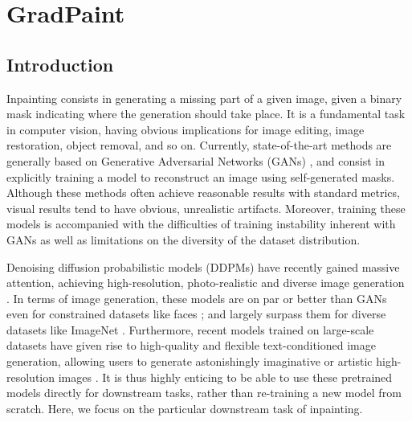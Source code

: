 \chapter{GradPaint}
\label{chapter:gradpaint}

 


\section{Introduction}

Inpainting consists in generating a missing part of a given image, given a binary mask 
indicating where the generation should take place. It is a fundamental task in computer
 vision, having obvious implications for image editing, image restoration, object 
 removal, and so on. Currently, state-of-the-art methods are generally based on 
 Generative Adversarial Networks (GANs) \cite{lama, zhao2021comodgan}, and consist 
 in explicitly training a model to reconstruct an image using self-generated masks.
  Although these methods often achieve reasonable results with standard metrics, 
  visual results tend to have obvious, unrealistic artifacts. Moreover, training 
  these models is accompanied with the difficulties of training instability inherent 
  with GANs as well as limitations on the diversity of the dataset distribution. 

Denoising diffusion probabilistic models (DDPMs) have recently gained massive attention,
 achieving high-resolution, photo-realistic and diverse image generation 
 \citep{dalle2, imagen, latentdiffusion, latentdiffusion2, guided-diffusion, glide}. In 
 terms of image generation, these models are on par or better than GANs even for 
 constrained datasets like faces \cite{latentdiffusion}; and largely surpass them for 
 diverse datasets like ImageNet \cite{glide, latentdiffusion}. Furthermore, 
 recent models trained on large-scale datasets 
 \cite{imagen, dalle2, glide, makeascene, latentdiffusion} have given rise to 
 high-quality and flexible text-conditioned image generation, allowing users to 
 generate astonishingly imaginative or artistic high-resolution images \cite{artcomp}. 
 It is thus highly enticing to be able to use these pretrained models directly for
  downstream tasks, rather than re-training a new model from scratch. Here, we focus 
  on the particular downstream task of inpainting.

